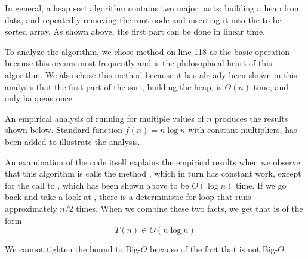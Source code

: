 \documentclass[11pt]{article}
\begin{document}
In general, a heap sort algorithm contains two major parts: building a heap from data, and repeatedly removing the root node and inserting it into the to-be-sorted array. As shown above, the first part can be done in linear time.

To analyze the  algorithm, we chose  method on line 118 as the basic operation because this occurs most frequently and is the philosophical heart of this algorithm. We also chose this method because it has already been shown in this analysis that the first part of the sort, building the heap, is $\Theta(n)$ time, and only happens once.

An empirical analysis of running  for multiple values of $n$ produces the results shown below. Standard function $f(n) = n \log n$ with constant multipliers, has been added to illustrate the analysis.

\begin{center}
    
\end{center}

An examination of the code itself explains the empirical results when we observe that this algorithm is calls the method , which in turn has constant work, except for the call to , which has been shown above to be $O(\log n)$ time. If we go back and take a look at , there is a deterministic for loop that runs approximately $n/2$ times. When we combine these two facts, we get that  is of the form
\[
	T(n)\in O(n\log n)
\]
	
We cannot tighten the bound to Big-$\Theta$ because of the fact that  is not Big-$\Theta$.
\nocite{*}
\clearpage
\printbibliography
\end{document}
